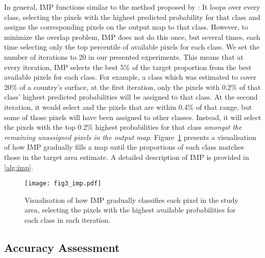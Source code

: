     In general, IMP functions similar to the method proposed by \citet{horvath2021comparison}: It loops over every class, selecting the pixels with the highest predicted probability for that class and assigns the corresponding pixels on the output map to that class. However, to minimize the overlap problem, IMP does not do this once, but several times, each time selecting only the top percentile of available pixels for each class. We set the number of iterations to 20 in our presented experiments. This means that at every iteration, IMP selects the best 5\% of the target proportion from the best available pixels for each class.
    For example, a class which was estimated to cover 20\% of a country's surface, at the first iteration, only the pixels with 0.2\% of that class' highest predicted probabilities will be assigned to that class. At the second iteration, it would select and the pixels that are within 0.4\% of that range, but some of those pixels will have been assigned to other classes. Instead, it will select the pixels with the top 0.2\% highest probabilities for that class \textit{amongst the remaining unassigned pixels in the output map}. Figure~\ref{fig:imp} presents a visualisation of how IMP gradually fills a map until the proportions of each class matches those in the target area estimate. A detailed description of IMP is provided in \ref{alg:imp}.

    \begin{figure}[H]
        \centering
        \texttt{[image: fig3\_imp.pdf]}
        \caption{Visualisation of how IMP gradually classifies each pixel in the study area, selecting the pixels with the highest available probabilities for each class in each iteration.}
        \label{fig:imp}
    \end{figure}

    \subsection{Accuracy Assessment}
    
